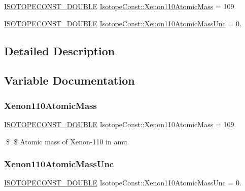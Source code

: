 \begin{DoxyCompactItemize}
\item 
\mbox{\hyperlink{group___isotope_const-_macros_ga8f45a7272ce02c0b4c65c44636ed719a}{I\+S\+O\+T\+O\+P\+E\+C\+O\+N\+S\+T\+\_\+\+D\+O\+U\+B\+LE}} \mbox{\hyperlink{group___isotope_const-_xenon-_xe110_ga61ca3a3d61f6271e617f09f6159b4aa3}{Isotope\+Const\+::\+Xenon110\+Atomic\+Mass}} = 109.
\item 
\mbox{\hyperlink{group___isotope_const-_macros_ga8f45a7272ce02c0b4c65c44636ed719a}{I\+S\+O\+T\+O\+P\+E\+C\+O\+N\+S\+T\+\_\+\+D\+O\+U\+B\+LE}} \mbox{\hyperlink{group___isotope_const-_xenon-_xe110_ga4447b1bd280369b5dc9194835df46f84}{Isotope\+Const\+::\+Xenon110\+Atomic\+Mass\+Unc}} = 0.
\end{DoxyCompactItemize}


\subsection{Detailed Description}


\subsection{Variable Documentation}
\mbox{\label{group___isotope_const-_xenon-_xe110_ga61ca3a3d61f6271e617f09f6159b4aa3}} 
\subsubsection{\texorpdfstring{Xenon110\+Atomic\+Mass}{Xenon110AtomicMass}}
{\footnotesize\ttfamily \mbox{\hyperlink{group___isotope_const-_macros_ga8f45a7272ce02c0b4c65c44636ed719a}{I\+S\+O\+T\+O\+P\+E\+C\+O\+N\+S\+T\+\_\+\+D\+O\+U\+B\+LE}} Isotope\+Const\+::\+Xenon110\+Atomic\+Mass = 109.}

\$ \$ Atomic mass of Xenon-\/110 in amu. \mbox{\label{group___isotope_const-_xenon-_xe110_ga4447b1bd280369b5dc9194835df46f84}} 
\subsubsection{\texorpdfstring{Xenon110\+Atomic\+Mass\+Unc}{Xenon110AtomicMassUnc}}
{\footnotesize\ttfamily \mbox{\hyperlink{group___isotope_const-_macros_ga8f45a7272ce02c0b4c65c44636ed719a}{I\+S\+O\+T\+O\+P\+E\+C\+O\+N\+S\+T\+\_\+\+D\+O\+U\+B\+LE}} Isotope\+Const\+::\+Xenon110\+Atomic\+Mass\+Unc = 0.}

